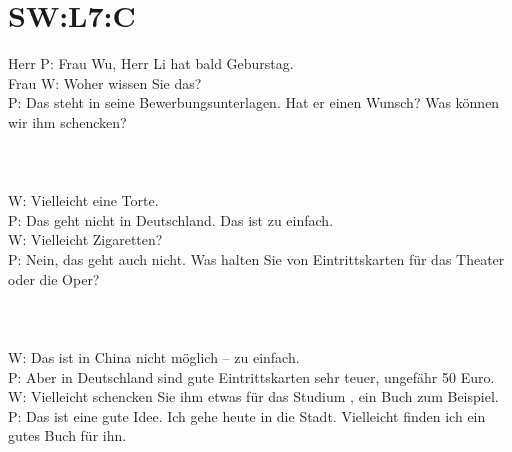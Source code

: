 \section{SW:L7:C}
\noindent
Herr P: Frau Wu, Herr Li hat bald Geburstag. \\
Frau W: Woher wissen Sie das? \\
P: Das steht in seine Bewerbungsunterlagen.  Hat er einen Wunsch? Was können wir ihm schencken? \\
\\
\\
\\
\noindent
W: Vielleicht eine Torte. \\
P: Das geht nicht in Deutschland. Das ist zu einfach. \\
W: Vielleicht Zigaretten? \\
P: Nein, das geht auch nicht. Was halten Sie von Eintrittskarten für das Theater oder die Oper?  \\
\\
\\
\\
\noindent
W: Das ist in China nicht möglich -- zu einfach. \\
P: Aber in Deutschland sind gute Eintrittskarten sehr teuer, ungefähr 50 Euro. \\
W: Vielleicht schencken Sie ihm etwas für das Studium , ein Buch zum Beispiel. \\
P: Das ist eine gute Idee. Ich gehe heute in die Stadt. Vielleicht finden ich ein gutes Buch für ihn. \\


